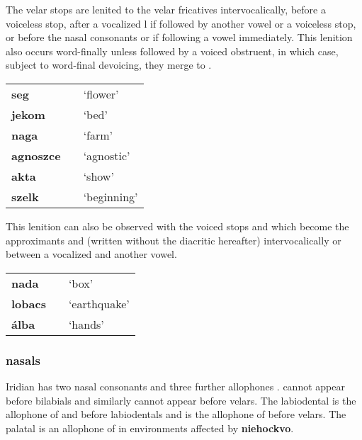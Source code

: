 \par The velar stops  are lenited to the velar fricatives  intervocalically, before a voiceless stop, after a vocalized l if followed by another vowel or a voiceless stop, or before the nasal consonants  or  if following a vowel immediately. This lenition also occurs word-finally unless followed by a voiced obstruent, in which case, subject to word-final devoicing, they merge to \textipa{[x]}.
\begin{center}
	\centering \small
	\begin{tabularx}{0.8\textwidth}{>{\bfseries}YYY}
		seg			&&`flower'\\
		jekom		&&`bed'\\
		naga		&&`farm'\\
		agnoszce	& &`agnostic'\\
		akta		&&`show'\\
		szelk		&&`beginning'\\
	\end{tabularx}
\end{center}

\par This lenition can also be observed with the voiced stops  and  which become the approximants  and  (written without the diacritic hereafter) intervocalically or between a vocalized  and another vowel.
\begin{center}
	\centering \small
	\begin{tabularx}{0.8\textwidth}{>{\bfseries}YYY}
		nada &  & `box'\\
		lobacs&&`earthquake'\\
		álba && `hands'\\
	\end{tabularx}
\end{center}


\subsubsection{nasals}
Iridian has two nasal consonants  and three further allophones .  cannot appear before bilabials and similarly  cannot appear before velars. The labiodental  is the allophone of  and  before labiodentals and  is the allophone of  before velars. The palatal \pn{\nn} is an allophone of  in environments affected by \textbf{niehockvo}.

